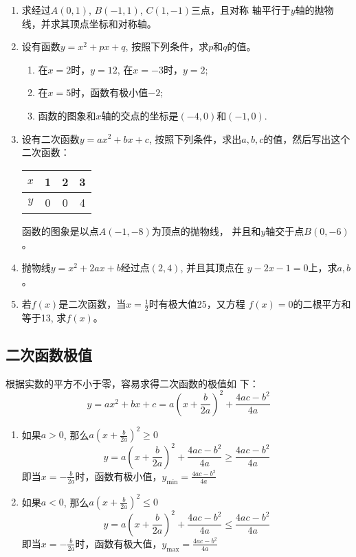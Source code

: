 \begin{ex}
\begin{enumerate}
\item 求经过$A(0,1)$, $B(-1,1)$, $C(1,-1)$三点，且对称
    轴平行于$y$轴的抛物线，并求其顶点坐标和对称轴。
    \item 设有函数$y=x^2+px+q$, 按照下列条件，求$p$和$q$的值。
    \begin{enumerate}
 \item 在$x=2$时，$y=12$, 在$x=-3$时，$y=2$;
    \item 在$x=5$时，函数有极小值$-2$;
    \item 函数的图象和$x$轴的交点的坐标是$(-4,0)$和$(-1,
    0)$.
    \end{enumerate}
   
    \item 设有二次函数$y=ax^2+bx+c$, 按照下列条件，求出$a,b,
    c$的值，然后写出这个二次函数：
    \begin{center}
        \begin{tabular}{c|ccc}
            \hline
$x$&1&2&3\\
            \hline
$y$&0&0&4\\
            \hline
        \end{tabular}
    \end{center}
    函数的图象是以点$A(-1,-8)$为顶点的抛物线，
   并且和$y$轴交于点$B(0,-6)$。

    \item 抛物线$y=x^2+2ax+b$经过点$(2,4)$, 并且其顶点在
    $y-2x-1=0$上，求$a,b$。
    \item 若$f(x)$是二次函数，当$x=\frac{1}{2}$时有极大值25，又方程
    $f(x)=0$的二根平方和等于13, 求$f(x)$。
\end{enumerate} 
\end{ex}

\subsection{二次函数极值}
根据实数的平方不小于零，容易求得二次函数的极值如
下：
\[y=ax^2+bx+c=a\left(x+\frac{b}{2a}\right)^2+\frac{4ac-b^2}{4a}\]
\begin{enumerate}
    \item 如果$a>0$, 那么$a\left(x+\frac{b}{2a}\right)^2\ge 0$
\[y=a\left(x+\frac{b}{2a}\right)^2+\frac{4ac-b^2}{4a}\ge \frac{4ac-b^2}{4a}\]
即当$x=-\frac{b}{2a}$时，函数有极小值，$y_{\min}=\frac{4ac-b^2}{4a}$

\item 如果$a<0$, 那么$a\left(x+\frac{b}{2a} \right)^2\le 0$
\[y=a\left(x+\frac{b}{2a}\right)^2+\frac{4ac-b^2}{4a}\le \frac{4ac-b^2}{4a}\]
即当$x=-\frac{b}{2a}$时，函数有极大值，$y_{\max}=\frac{4ac-b^2}{4a}$
\end{enumerate}

